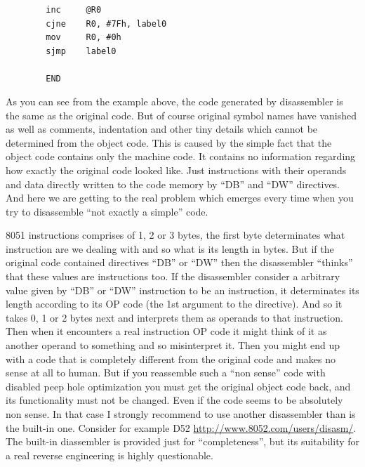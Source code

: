 \documentclass[a4paper,twoside,12pt]{book}
\begin{document}
\begin{minipage}{\textwidth}
\begin{minipage}[t]{.4\textwidth}
			\verb'        '{\color{highlight_instruction}\verb'inc'}\verb'     '{\color{highlight_indirect}\verb'@R0'}\\
			\verb'        '{\color{highlight_instruction}\verb'cjne'}\verb'    '{\color{highlight_sfr}\verb'R0'}{\color{highlight_oper_sep}\verb','}\verb' '{\color{highlight_imm_hex}\verb'#7Fh'}{\color{highlight_oper_sep}\verb','}\verb' '{\color{highlight_constant}\verb'label0'}\\
			\verb'        '{\color{highlight_instruction}\verb'mov'}\verb'     '{\color{highlight_sfr}\verb'R0'}{\color{highlight_oper_sep}\verb','}\verb' '{\color{highlight_imm_hex}\verb'#0h'}\\
			\verb'        '{\color{highlight_instruction}\verb'sjmp'}\verb'    '{\color{highlight_constant}\verb'label0'}\\
			\verb''\\
			\verb'        '{\color{highlight_directive}\verb'END'}\\
		\end{minipage}
		\onecolumn
	\end{minipage}

	As you can see from the example above, the code generated by disassembler is the same as the original code. But of course original symbol names have vanished as well as comments, indentation and other tiny details which cannot be determined from the object code. This is caused by the simple fact that the object code contains only the machine code. It contains no information regarding how exactly the original code looked like. Just instructions with their operands and data directly written to the code memory by ``DB'' and ``DW'' directives. And here we are getting to the real problem which emerges every time when you try to disassemble ``not exactly a simple'' code.

	8051 instructions comprises of 1, 2 or 3 bytes, the first byte determinates what instruction are we dealing with and so what is its length in bytes. But if the original code contained directives ``DB'' or ``DW'' then the disassembler ``thinks'' that these values are instructions too. If the disassembler consider a arbitrary value given by ``DB'' or ``DW'' instruction to be an instruction, it determinates its length according to its OP code (the 1st argument to the directive). And so it takes 0, 1 or 2 bytes next and interprets them as operands to that instruction. Then when it encounters a real instruction OP code it might think of it as another operand to something and so misinterpret it. Then you might end up with a code that is completely different from the original code and makes no sense at all to human. But if you reassemble such a ``non sense'' code with disabled peep hole optimization you must get the original object code back, and its functionality must not be changed. Even if the code seems to be
absolutely non sense. In that case I strongly recommend to use another disassembler than is the built-in one. Consider for example D52 \url{http://www.8052.com/users/disasm/}. The built-in diassembler is provided just for ``completeness'', but its suitability for a real reverse engineering is highly questionable.
\end{document}
